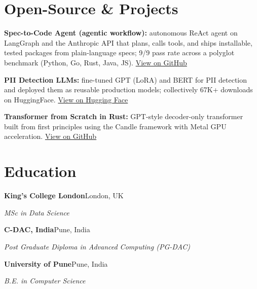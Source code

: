 \documentclass[10pt,a4paper]{article}
\begin{document}
\section{Open-Source \& Projects}
\begin{tight}
  \item \textbf{Spec-to-Code Agent (agentic workflow):} autonomous ReAct agent on LangGraph and the Anthropic API that plans, calls tools, and ships installable, tested packages from plain-language specs; 9/9 pass rate across a polyglot benchmark (Python, Go, Rust, Java, JS). \href{https://github.com/abhijeetscode/Spec-to-Code-Agent}{View on GitHub}
  \item \textbf{PII Detection LLMs:} fine-tuned GPT (LoRA) and BERT for PII detection and deployed them as reusable production models; collectively 67K+ downloads on HuggingFace. \href{https://huggingface.co/ab-ai/pii_model}{View on Hugging Face}
  \item \textbf{Transformer from Scratch in Rust:} GPT-style decoder-only transformer built from first principles using the Candle framework with Metal GPU acceleration. \href{https://github.com/abhijeetscode/transformer-rust}{View on GitHub}
\end{tight}

\section{Education}
{\color{company}\bfseries King's College London}\hfill {\color{muted}London, UK}\par
{\itshape MSc in Data Science}\par\vspace{2pt}
{\color{company}\bfseries C-DAC, India}\hfill {\color{muted}Pune, India}\par
{\itshape Post Graduate Diploma in Advanced Computing (PG-DAC)}\par\vspace{2pt}
{\color{company}\bfseries University of Pune}\hfill {\color{muted}Pune, India}\par
{\itshape B.E. in Computer Science}\par
\end{document}
